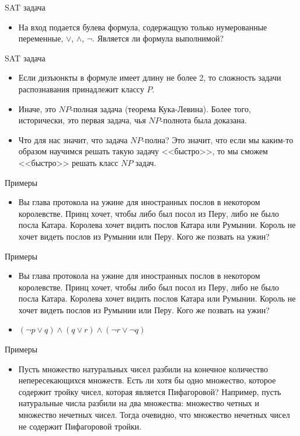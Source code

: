 \documentclass{beamer}
\begin{document}
\begin{frame}{SAT задача}
\begin{itemize}
\item На вход подается булева формула, содержащую только нумерованные переменные, $\vee$, $\wedge$, $\lnot$. Является ли формула выполнимой?
\end{itemize}
\end{frame}

\begin{frame}{SAT задача}
\begin{itemize}
\item Если дизъюнкты в формуле имеет длину не более 2, то сложность задачи распознавания принадлежит классу $P$.
\item Иначе, это $NP$-полная задача (теорема Кука-Левина). Более того, исторически, это первая задача, чья $NP$-полнота была доказана.
\item Что для нас значит, что задача $NP$-полна? Это значит, что если мы каким-то образом научимся решать такую задачу <<быстро>>, то
мы сможем <<быстро>> решать класс $NP$ задач.
\end{itemize}
\end{frame}

\begin{frame}{Примеры}
\begin{itemize}
\item Вы глава протокола на ужине для иностранных послов в некотором королевстве. Принц хочет, чтобы либо был посол из Перу,
либо не было посла Катара. Королева хочет видить послов Катара или Румынии. Король не хочет видеть послов из Румынии или Перу.
Кого же позвать на ужин?
\end{itemize}
\end{frame}

\begin{frame}{Примеры}
\begin{itemize}
\item Вы глава протокола на ужине для иностранных послов в некотором королевстве. Принц хочет, чтобы либо был посол из Перу,
либо не было посла Катара. Королева хочет видить послов Катара или Румынии. Король не хочет видеть послов из Румынии или Перу.
Кого же позвать на ужин?
\item $(\lnot p \vee q) \wedge (q \vee r) \wedge (\lnot r \vee \lnot q)$
\end{itemize}
\end{frame}

\begin{frame}{Примеры}
\begin{itemize}
\item Пусть множество натуральных чисел разбили на конечное количество непересекающихся множеств. Есть ли хотя бы одно
множество, которое содержит тройку чисел, которая является Пифагоровой? Например, пусть натуральные числа разбили на два
множества: множество четных и множество нечетных чисел. Тогда очевидно, что множество нечетных чисел не содержит Пифагоровой
тройки.
\end{itemize}
\end{frame}
\end{document}
